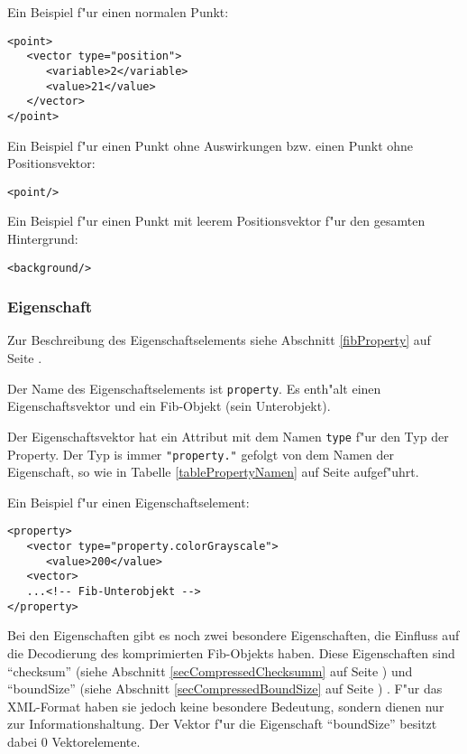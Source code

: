 \bigskip\noindent
Ein Beispiel f"ur einen normalen Punkt:
\begin{verbatim}
<point>
   <vector type="position">
      <variable>2</variable>
      <value>21</value>
   </vector>
</point>
\end{verbatim}

\bigskip\noindent
Ein Beispiel f"ur einen Punkt ohne Auswirkungen bzw. einen Punkt ohne Positionsvektor:
\begin{verbatim}
<point/>
\end{verbatim}

\bigskip\noindent
Ein Beispiel f"ur einen Punkt mit leerem Positionsvektor f"ur den gesamten Hintergrund:
\begin{verbatim}
<background/>
\end{verbatim}



\subsubsection{Eigenschaft}
\label{secXmlProperty}

Zur Beschreibung des Eigenschaftselements siehe Abschnitt \ref{fibProperty} auf Seite \pageref{fibProperty} .

Der Name des Eigenschaftselements ist \verb|property|. Es enth"alt einen Eigenschaftsvektor und ein Fib-Objekt (sein Unterobjekt).

Der Eigenschaftsvektor hat ein Attribut mit dem Namen \verb|type| f"ur den Typ der Property.  Der Typ is immer \verb|"property."| gefolgt von dem Namen der Eigenschaft, so wie in Tabelle \ref{tablePropertyNamen} auf Seite \pageref{tablePropertyNamen} aufgef"uhrt.

\bigskip\noindent
Ein Beispiel f"ur einen Eigenschaftselement:
\begin{verbatim}
<property>
   <vector type="property.colorGrayscale">
      <value>200</value>
   <vector>
   ...<!-- Fib-Unterobjekt -->
</property>
\end{verbatim}


\bigskip\noindent
Bei den Eigenschaften gibt es noch zwei besondere Eigenschaften, die Einfluss auf die Decodierung des komprimierten Fib-Objekts haben. Diese Eigenschaften sind ``checksum'' (siehe Abschnitt \ref{secCompressedChecksumm} auf Seite \pageref{secCompressedChecksumm}) und ``boundSize'' (siehe Abschnitt \ref{secCompressedBoundSize} auf Seite \pageref{secCompressedBoundSize}) . F"ur das XML-Format haben sie jedoch keine besondere Bedeutung, sondern dienen nur zur Informationshaltung. Der Vektor f"ur die Eigenschaft ``boundSize'' besitzt dabei $0$ Vektorelemente.

